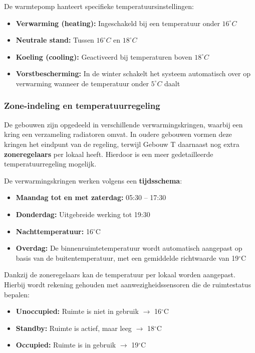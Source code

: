 De warmtepomp hanteert specifieke temperatuursinstellingen:

\begin{itemize}
    \item \textbf{Verwarming (heating):} Ingeschakeld bij een temperatuur onder $16^{\circ}C$
    \item \textbf{Neutrale stand:} Tussen $16^{\circ}C$ en $18^{\circ}C$
    \item \textbf{Koeling (cooling):} Geactiveerd bij temperaturen boven $18^{\circ}C$
    \item \textbf{Vorstbescherming:} In de winter schakelt het systeem automatisch over op verwarming wanneer de temperatuur onder $5^{\circ}C$ daalt
\end{itemize}

\subsubsection{Zone-indeling en temperatuurregeling}
De gebouwen zijn opgedeeld in verschillende verwarmingskringen, waarbij een kring een verzameling radiatoren omvat. In oudere gebouwen vormen deze kringen het eindpunt van de regeling, terwijl Gebouw T daarnaast nog extra \textbf{zoneregelaars} per lokaal heeft. Hierdoor is een meer gedetailleerde temperatuurregeling mogelijk.

De verwarmingskringen werken volgens een \textbf{tijdsschema}:

\begin{itemize}
    \item \textbf{Maandag tot en met zaterdag:} 05:30 -- 17:30
    \item \textbf{Donderdag:} Uitgebreide werking tot 19:30
    \item \textbf{Nachttemperatuur:} 16$^{\circ}$C
    \item \textbf{Overdag:} De binnenruimtetemperatuur wordt automatisch aangepast op basis van de buitentemperatuur, met een gemiddelde richtwaarde van 19$^{\circ}$C
\end{itemize}

Dankzij de zoneregelaars kan de temperatuur per lokaal worden aangepast. Hierbij wordt rekening gehouden met aanwezigheidssensoren die de ruimtestatus bepalen:

\begin{itemize}
    \item \textbf{Unoccupied:} Ruimte is niet in gebruik $\rightarrow$ 16$^{\circ}$C
    \item \textbf{Standby:} Ruimte is actief, maar leeg $\rightarrow$ 18$^{\circ}$C
    \item \textbf{Occupied:} Ruimte is in gebruik $\rightarrow$ 19$^{\circ}$C
\end{itemize}

